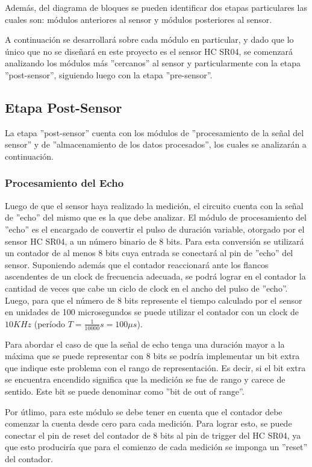 Además, del diagrama de bloques se pueden identificar dos etapas particulares
las cuales son: módulos anteriores al sensor y módulos posteriores
al sensor. 

A continuación se desarrollará sobre cada módulo en particular, y
dado que lo único que no se diseñará en este proyecto es el sensor
HC SR04, se comenzará analizando los módulos más ''cercanos'' al
sensor y particularmente con la etapa ''post-sensor'', siguiendo
luego con la etapa ''pre-sensor''.

\subsection{Etapa Post-Sensor}

La etapa ''post-sensor'' cuenta con los módulos de ''procesamiento
de la señal del sensor'' y de ''almacenamiento de los datos procesados'',
los cuales se analizarán a continuación.

\subsubsection{Procesamiento del Echo}

Luego de que el sensor haya realizado la medición, el circuito cuenta
con la señal de ''echo'' del mismo que es la que debe analizar.
El módulo de procesamiento del ''echo'' es el encargado de convertir
el pulso de duración variable, otorgado por el sensor HC SR04, a un
número binario de 8 bits. Para esta conversión se utilizará un contador
de al menos 8 bits cuya entrada se conectará al pin de ''echo''
del sensor. Suponiendo además que el contador reaccionará ante los
flancos ascendentes de un clock de frecuencia adecuada, se podrá lograr
en el contador la cantidad de veces que cabe un ciclo de clock en
el ancho del pulso de ''echo''. Luego, para que el número de 8 bits
represente el tiempo calculado por el sensor en unidades de 100 microsegundos
se puede utilizar el contador con un clock de $10KHz$ (período $T=\frac{1}{10000}s=100\mu s$).

Para abordar el caso de que la señal de echo tenga una duración mayor
a la máxima que se puede representar con 8 bits se podría implementar
un bit extra que indique este problema con el rango de representación.
Es decir, si el bit extra se encuentra encendido significa que la
medición se fue de rango y carece de sentido. Este bit se puede denominar
como ''bit de out of range''.

Por útlimo, para este módulo se debe tener en cuenta que el contador
debe comenzar la cuenta desde cero para cada medición. Para lograr
esto, se puede conectar el pin de reset del contador de 8 bits al
pin de trigger del HC SR04, ya que esto produciría que para el comienzo
de cada medición se imponga un ''reset'' del contador.\newline

